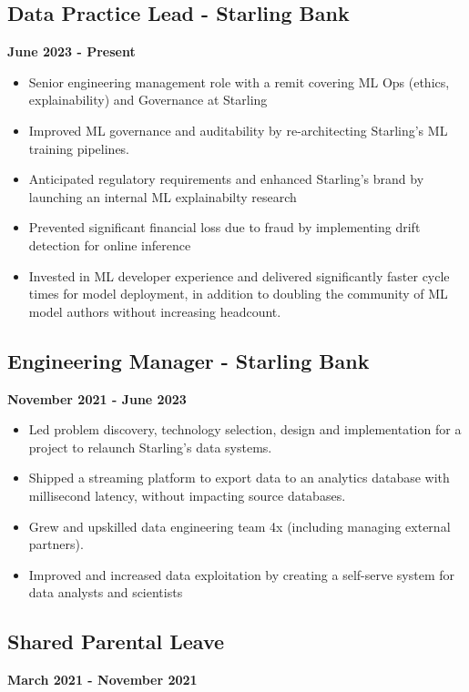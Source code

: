 \documentclass[a4paper]{scrartcl}
\begin{document}
\subsection*{Data Practice Lead - Starling Bank}
\textbf{June 2023 - Present}
\begin{itemize}
	\item Senior engineering management role with a remit covering ML Ops
	      (ethics,
	      explainability) and Governance at Starling
	\item Improved ML governance and auditability by re-architecting
	      Starling's ML training pipelines.
	\item Anticipated regulatory requirements and enhanced Starling's brand
	      by launching an internal ML explainabilty research
	\item Prevented significant financial loss due to fraud by implementing
	      drift detection for online inference
	\item Invested in ML developer experience and delivered significantly
	      faster cycle times for model deployment, in addition to doubling the community
	      of ML model authors without increasing headcount.
\end{itemize}

\subsection*{Engineering Manager - Starling Bank}
\textbf{November 2021 - June 2023}
\begin{itemize}
	\item Led problem discovery, technology selection, design and
	      implementation for a project to relaunch Starling's data systems.
	\item Shipped a streaming platform to export data to an analytics
	      database
	      with millisecond latency, without impacting source databases.
	\item Grew and upskilled data engineering team 4x (including managing
	      external partners).
	\item Improved and increased data exploitation by creating a self-serve
	      system for data analysts and scientists
\end{itemize}

\subsection*{Shared Parental Leave}
\textbf{March 2021 - November 2021}
\end{document}
